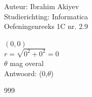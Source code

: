 \documentclass[a4paper]{article}
\begin{document}
\noindent \large Auteur: Ibrahim Akiyev \\
\noindent \large Studierichting: Informatica\\
\noindent \large Oefeningenreeks 1C nr. 2.9\\

\medskip

\normalsize

$(0,0)$\\

$ r = \sqrt{0^2+0^2} = 0$\\

$\theta$ mag overal\\

Antwoord: (0,$\theta$)

\begin{thebibliography}{999}
\end{thebibliography}
\end{document}
